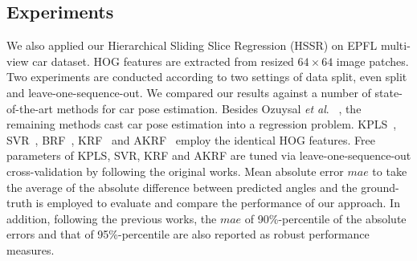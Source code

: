 \documentclass{tutmscthesis}[2010/09/22]
\numberwithin{equation}{section}
\numberwithin{table}{section}
\numberwithin{figure}{section}
\def\onedot{. }
\def\etal{\emph{et al}\onedot}
\begin{document}
\subsection{Experiments}
We also applied our Hierarchical Sliding Slice Regression (HSSR) on EPFL multi-view car dataset. HOG features are extracted from resized $64 \times 64$ image patches. Two experiments are conducted according to two settings of data split, even split and leave-one-sequence-out. We compared our results against a number of state-of-the-art methods for car pose estimation. Besides Ozuysal \etal~\cite{ozuysal2009pose}, the remaining methods cast car pose estimation into a regression problem.  
KPLS~\cite{rosipal2002kernel}, SVR~\cite{cortes1995support},
BRF~\cite{hara2014growing}, KRF~\cite{hara2014growing} and
AKRF~\cite{hara2014growing} employ the identical HOG features.   
Free parameters of KPLS, SVR, KRF and AKRF are tuned via
leave-one-sequence-out cross-validation by following the original works. 
Mean absolute error $mae$ to take the average of the absolute
difference between predicted angles and the ground-truth is employed
to evaluate and compare the performance of our approach. In addition,
following the previous works, the $mae$ of 90\%-percentile of the
absolute errors and that of 95\%-percentile are also reported as
robust performance measures. 
\end{document}
